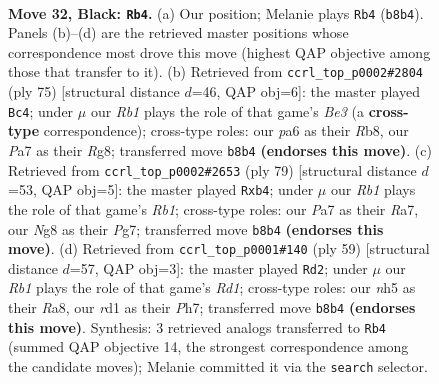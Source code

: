 \documentclass[11pt]{article}
\begin{document}
\clearpage

\begin{figure}[p]\centering
\begin{subfigure}{0.46\textwidth}\centering
\resizebox{\linewidth}{!}{%
\newchessgame
\chessboard[
  setfen={rrk3nb/p4p1p/P1p5/2P4N/4P3/8/5B2/3R1RK1 b - - 0 32},
  showmover=false,
  pgfstyle=straightmove, color=movearrow, markmove={b8-b4}
]}
\caption{}
\end{subfigure}\hfill
\begin{subfigure}{0.46\textwidth}\centering
\resizebox{\linewidth}{!}{%
\newchessgame
\chessboard[
  setfen={1r4r1/1n3k1p/3pbp1P/8/p3PN2/P1P5/2B5/2KR1R2 b - - 0 38},
  showmover=false,
  pgfstyle=straightmove, color=movearrow, markmove={e6-c4}
]}
\caption{}
\end{subfigure}
\\[4pt]
\begin{subfigure}{0.46\textwidth}\centering
\resizebox{\linewidth}{!}{%
\newchessgame
\chessboard[
  setfen={kr6/r2b2p1/2p3B1/4R2P/1P1P1p2/8/5P2/2K1R3 b - - 0 40},
  showmover=false,
  pgfstyle=straightmove, color=movearrow, markmove={b8-b4}
]}
\caption{}
\end{subfigure}\hfill
\begin{subfigure}{0.46\textwidth}\centering
\resizebox{\linewidth}{!}{%
\newchessgame
\chessboard[
  setfen={r2r3k/1p5p/1p3R2/4n3/8/1B6/PP5P/5R1K b - - 4 30},
  showmover=false,
  pgfstyle=straightmove, color=movearrow, markmove={d8-d2}
]}
\caption{}
\end{subfigure}
\caption{\textbf{Move 32, Black: \texttt{Rb4}.} (a) Our position; Melanie plays \texttt{Rb4} (\texttt{b8b4}). Panels (b)--(d) are the retrieved master positions whose correspondence most drove this move (highest QAP objective among those that transfer to it). (b) Retrieved from \texttt{ccrl\_top\_p0002\#2804} (ply 75) [structural distance $d$=46, QAP obj=6]: the master played \texttt{Bc4}; under $\mu$ our \emph{Rb1} plays the role of that game's \emph{Be3} (a \textbf{cross-type} correspondence); cross-type roles: our \emph{p}a6 as their \emph{R}b8, our \emph{P}a7 as their \emph{R}g8; transferred move \texttt{b8b4} \textbf{(endorses this move)}. (c) Retrieved from \texttt{ccrl\_top\_p0002\#2653} (ply 79) [structural distance $d$=53, QAP obj=5]: the master played \texttt{Rxb4}; under $\mu$ our \emph{Rb1} plays the role of that game's \emph{Rb1}; cross-type roles: our \emph{P}a7 as their \emph{R}a7, our \emph{N}g8 as their \emph{P}g7; transferred move \texttt{b8b4} \textbf{(endorses this move)}. (d) Retrieved from \texttt{ccrl\_top\_p0001\#140} (ply 59) [structural distance $d$=57, QAP obj=3]: the master played \texttt{Rd2}; under $\mu$ our \emph{Rb1} plays the role of that game's \emph{Rd1}; cross-type roles: our \emph{n}h5 as their \emph{R}a8, our \emph{r}d1 as their \emph{P}h7; transferred move \texttt{b8b4} \textbf{(endorses this move)}. Synthesis: 3 retrieved analogs transferred to \texttt{Rb4} (summed QAP objective 14, the strongest correspondence among the candidate moves); Melanie committed it via the \texttt{search} selector.}
\label{fig:thought-m63}
\end{figure}
\end{document}
